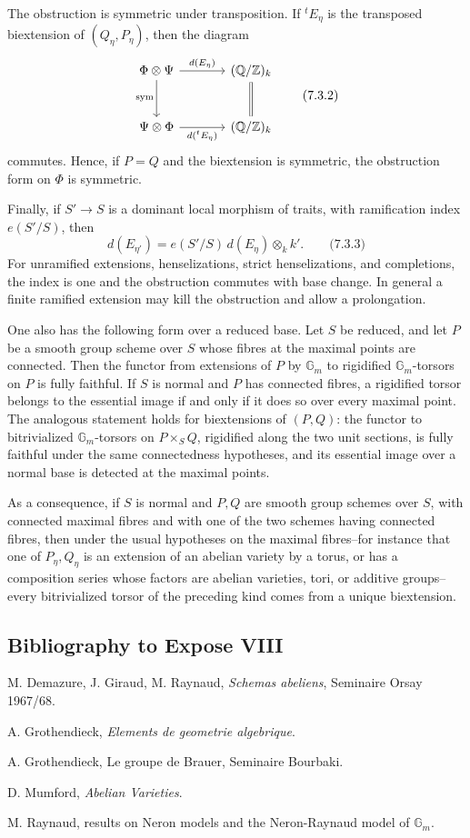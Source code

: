 \documentclass[11pt]{article}
\providecommand{\Z}{\mathbb Z}
\providecommand{\Q}{\mathbb Q}
\providecommand{\Gm}{\mathbb G_m}
\begin{document}
The obstruction is symmetric under transposition.  If \({}^tE_\eta\) is the transposed biextension of \((Q_\eta,P_\eta)\), then the diagram
\[
\begin{tikzcd}[column sep=large,row sep=large]
 \Phi\otimes\Psi \arrow[r,"d(E_\eta)"]\arrow[d,"\mathrm{sym}"'] & (\Q/\Z)_k\arrow[d,equal]\\
 \Psi\otimes\Phi \arrow[r,"d({}^tE_\eta)"'] & (\Q/\Z)_k
\end{tikzcd}
\qquad\text{(7.3.2)}
\]
commutes.  Hence, if \(P=Q\) and the biextension is symmetric, the obstruction form on \(\Phi\) is symmetric.

Finally, if \(S'\to S\) is a dominant local morphism of traits, with ramification index \(e(S'/S)\), then
\[
        d(E_{\eta'})=e(S'/S)\, d(E_\eta)\otimes_k k'.
\qquad\text{(7.3.3)}
\]
For unramified extensions, henselizations, strict henselizations, and completions, the index is one and the obstruction commutes with base change.  In general a finite ramified extension may kill the obstruction and allow a prolongation.

One also has the following form over a reduced base.  Let \(S\) be reduced, and let \(P\) be a smooth group scheme over \(S\) whose fibres at the maximal points are connected.  Then the functor from extensions of \(P\) by \(\Gm\) to rigidified \(\Gm\)-torsors on \(P\) is fully faithful.  If \(S\) is normal and \(P\) has connected fibres, a rigidified torsor belongs to the essential image if and only if it does so over every maximal point.  The analogous statement holds for biextensions of \((P,Q)\): the functor to bitrivialized \(\Gm\)-torsors on \(P\times_SQ\), rigidified along the two unit sections, is fully faithful under the same connectedness hypotheses, and its essential image over a normal base is detected at the maximal points.

As a consequence, if \(S\) is normal and \(P,Q\) are smooth group schemes over \(S\), with connected maximal fibres and with one of the two schemes having connected fibres, then under the usual hypotheses on the maximal fibres--for instance that one of \(P_\eta,Q_\eta\) is an extension of an abelian variety by a torus, or has a composition series whose factors are abelian varieties, tori, or additive groups--every bitrivialized torsor of the preceding kind comes from a unique biextension.

\subsection*{Bibliography to Expose VIII}
\begin{enumerate}[label={[\arabic*]}]
\item M. Demazure, J. Giraud, M. Raynaud, \emph{Schemas abeliens}, Seminaire Orsay 1967/68.
\item A. Grothendieck, \emph{Elements de geometrie algebrique}.
\item A. Grothendieck, Le groupe de Brauer, Seminaire Bourbaki.
\item D. Mumford, \emph{Abelian Varieties}.
\item M. Raynaud, results on Neron models and the Neron-Raynaud model of \(\Gm\).
\end{enumerate}
\end{document}
